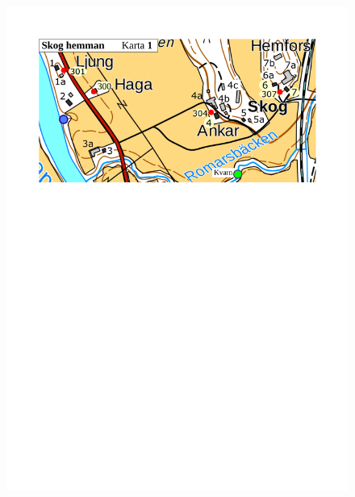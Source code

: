 \begin{figure}[htbp]
  \centering
  \includegraphics[width=1\textwidth]{kartor/Karta1.pdf}
  \label{map:1}
\end{figure}

